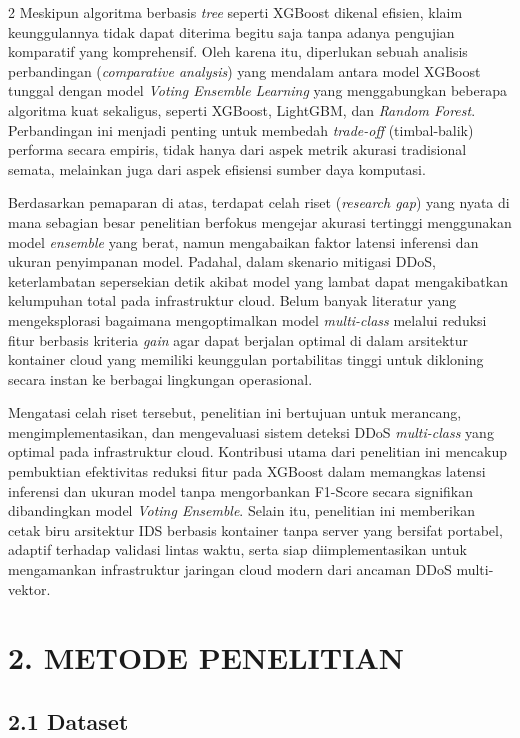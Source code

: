 \documentclass[10pt,a4paper]{article}
\begin{document}
\begin{multicols}{2}
Meskipun algoritma berbasis \textit{tree} seperti XGBoost dikenal efisien, klaim keunggulannya tidak dapat diterima begitu saja tanpa adanya pengujian komparatif yang komprehensif. Oleh karena itu, diperlukan sebuah analisis perbandingan (\textit{comparative analysis}) yang mendalam antara model XGBoost tunggal dengan model \textit{Voting Ensemble Learning} yang menggabungkan beberapa algoritma kuat sekaligus, seperti XGBoost, LightGBM, dan \textit{Random Forest}. Perbandingan ini menjadi penting untuk membedah \textit{trade-off} (timbal-balik) performa secara empiris, tidak hanya dari aspek metrik akurasi tradisional semata, melainkan juga dari aspek efisiensi sumber daya komputasi.

Berdasarkan pemaparan di atas, terdapat celah riset (\textit{research gap}) yang nyata di mana sebagian besar penelitian berfokus mengejar akurasi tertinggi menggunakan model \textit{ensemble} yang berat, namun mengabaikan faktor latensi inferensi dan ukuran penyimpanan model. Padahal, dalam skenario mitigasi DDoS, keterlambatan sepersekian detik akibat model yang lambat dapat mengakibatkan kelumpuhan total pada infrastruktur cloud. Belum banyak literatur yang mengeksplorasi bagaimana mengoptimalkan model \textit{multi-class} melalui reduksi fitur berbasis kriteria \textit{gain} agar dapat berjalan optimal di dalam arsitektur kontainer cloud yang memiliki keunggulan portabilitas tinggi untuk dikloning secara instan ke berbagai lingkungan operasional.

Mengatasi celah riset tersebut, penelitian ini bertujuan untuk merancang, mengimplementasikan, dan mengevaluasi sistem deteksi DDoS \textit{multi-class} yang optimal pada infrastruktur cloud. Kontribusi utama dari penelitian ini mencakup pembuktian efektivitas reduksi fitur pada XGBoost dalam memangkas latensi inferensi dan ukuran model tanpa mengorbankan F1-Score secara signifikan dibandingkan model \textit{Voting Ensemble}. Selain itu, penelitian ini memberikan cetak biru arsitektur IDS berbasis kontainer tanpa server yang bersifat portabel, adaptif terhadap validasi lintas waktu, serta siap diimplementasikan untuk mengamankan infrastruktur jaringan cloud modern dari ancaman DDoS multi-vektor.

\section*{\textbf{2. METODE PENELITIAN}}

\subsection*{2.1 Dataset}


\end{multicols}
\end{document}
